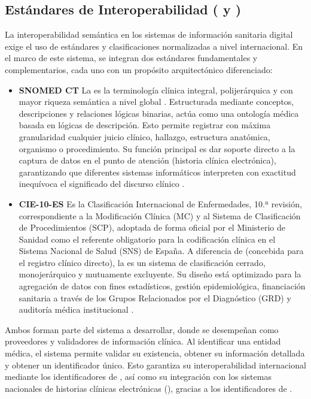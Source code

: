 \subsection{Estándares de Interoperabilidad ( y )}\label{subsection:estandares_interoperabilidad}
La interoperabilidad semántica en los sistemas de información sanitaria digital exige el uso de estándares
y clasificaciones normalizadas a nivel internacional. En el marco de este sistema, se 
integran dos estándares fundamentales y complementarios, cada uno con un propósito arquitectónico 
diferenciado:
\begin{itemize}
    \item \textbf{SNOMED CT} La  
    es la terminología clínica
    integral, polijerárquica y con mayor riqueza semántica a nivel global . Estructurada
    mediante conceptos, descripciones y relaciones lógicas binarias, actúa como una ontología médica
    basada en lógicas de descripción. Esto permite registrar con máxima granularidad
    cualquier juicio clínico, hallazgo, estructura anatómica, organismo o procedimiento. Su función principal
    es dar soporte directo a la captura de datos en el punto de atención (historia clínica electrónica), 
    garantizando que diferentes sistemas informáticos interpreten con exactitud inequívoca el significado
    del discurso clínico \cite{snomed2026}.
    \item \textbf{CIE-10-ES} Es la Clasificación Internacional de Enfermedades, 10.ª revisión, 
    correspondiente a la Modificación
    Clínica (MC) y al Sistema de Clasificación de Procedimientos (SCP), adoptada de forma oficial por el 
    Ministerio de Sanidad como el referente obligatorio para la codificación clínica en el Sistema 
    Nacional de Salud (SNS) de España. A diferencia de  
    (concebida para el registro clínico directo), la  es un sistema de clasificación
    cerrado, monojerárquico y mutuamente excluyente. Su diseño está optimizado para
    la agregación de datos con fines estadísticos, gestión epidemiológica, financiación sanitaria a 
    través de los Grupos Relacionados por el Diagnóstico (GRD) y auditoría médica institucional 
    \cite{sanidad2026}.
\end{itemize}

Ambos forman parte del sistema a desarrollar, donde se desempeñan como proveedores y validadores de información clínica.
Al identificar una entidad médica, el sistema permite validar su existencia, obtener su información detallada
y obtener un identificador único. Esto garantiza su interoperabilidad internacional mediante los identificadores
de , así como su integración con los sistemas nacionales de historias
clínicas electrónicas (), gracias a los identificadores de .

